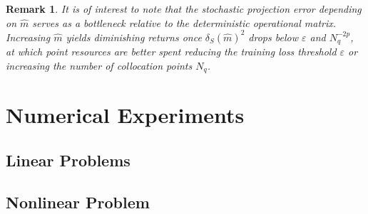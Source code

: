 \documentclass[11pt, a4paper]{article}
\theoremstyle{theoremstyle}
\theoremstyle{definitionstyle}
\newtheorem{remark}[theorem]{Remark}
\begin{document}
\begin{remark}
    It is of interest to note that the stochastic projection error depending on \(\hat m\) serves as a bottleneck relative to the deterministic operational matrix. Increasing \(\hat m\) yields diminishing returns once \(\delta_S(\hat m)^2\) drops below \(\varepsilon\) and \(N_q^{-2p}\), at which point resources are better spent reducing the training loss threshold \(\varepsilon\) or increasing the number of collocation points \(N_q\).
\end{remark}

\section{Numerical Experiments}

\lipsum[1]

\subsection{Linear Problems}

\lipsum[2]

\subsection{Nonlinear Problem}

\lipsum[3]

\printbibliography
\end{document}
